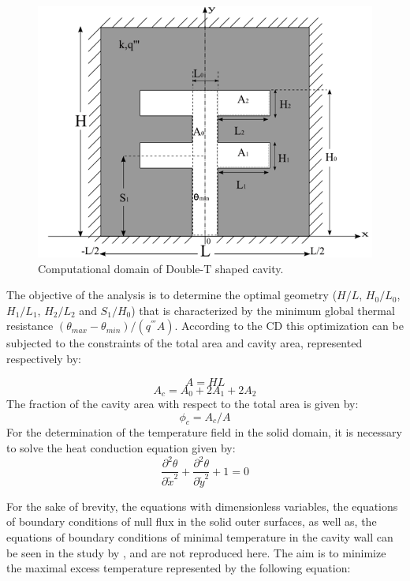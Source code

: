 \documentclass[12pt,fleqn]{article}
\begin{document}
\begin{figure}[H]
\centering
\includegraphics[width=0.6\linewidth]{imgs/duplo_t.png}
\caption{ {\small Computational domain of Double-T shaped cavity.}}
\label{figure01}
\end{figure}

The objective of the analysis is to determine the optimal geometry ($H/L$, $H_{0}/L_{0}$, $H_{1}/L_{1}$, $H_{2}/L_{2}$ and $S_{1}/H_{0}$) that is characterized by the minimum global thermal resistance $(\theta_{max} - \theta_{min})/(q^{'''}A)$. According to the CD this optimization can be subjected to the constraints of the total area and cavity area, represented respectively by:

\begin{equation}
A = HL \label{area_total}
\end{equation}
\begin{equation}
A_{c} = A_{0} + 2A_{1} + 2A_{2} \label{area_cavidade}
\end{equation}
The fraction of the cavity area with respect to the total area is given by:
\begin{equation}
\phi_{c} = A_{c}/A \label{fi}
\end{equation}
For the determination of the temperature field in the solid domain, it is necessary to solve the heat conduction equation given by:
\begin{equation}
\frac{\partial^{2} \theta}{\partial \tilde{x}^{2}}+\frac{\partial^{2} \theta}{\partial \tilde{y}^{2}}+1=0\label{calor}
\end{equation}

For the sake of brevity, the equations with dimensionless variables, the equations of boundary conditions of null flux in the solid outer surfaces, as well as, the equations of boundary conditions of minimal temperature in the cavity wall can be seen in the study by \cite{Gonzales2015b}, and are not reproduced here. The aim is to minimize the maximal excess temperature represented by the following equation:
\end{document}
